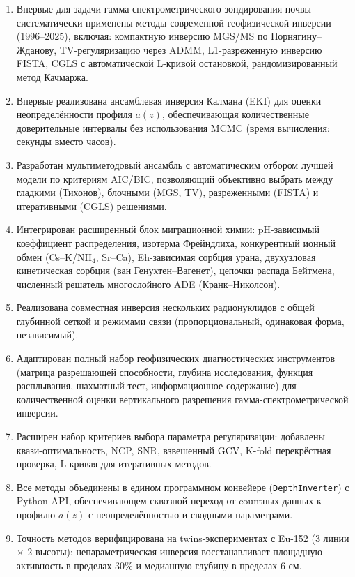 \documentclass[12pt,a4paper]{article}
\begin{document}
\begin{enumerate}[leftmargin=*,itemsep=4pt]
  \item Впервые для задачи гамма-спектрометрического зондирования
        почвы систематически применены методы современной
        геофизической инверсии (1996--2025), включая:
        компактную инверсию MGS/MS по Порнягину--Жданову,
        TV-регуляризацию через ADMM, L1-разреженную инверсию FISTA,
        CGLS с автоматической L-кривой остановкой,
        рандомизированный метод Качмаржа.

  \item Впервые реализована ансамблевая инверсия Калмана (EKI)
        для оценки неопределённости профиля $a(z)$,
        обеспечивающая количественные доверительные интервалы
        без использования MCMC (время вычисления: секунды
        вместо часов).

  \item Разработан мультиметодовый ансамбль с автоматическим
        отбором лучшей модели по критериям AIC/BIC,
        позволяющий объективно выбрать между гладкими (Тихонов),
        блочными (MGS, TV), разреженными (FISTA) и итеративными
        (CGLS) решениями.

  \item Интегрирован расширенный блок миграционной химии:
        pH-зависимый коэффициент распределения,
        изотерма Фрейндлиха, конкурентный ионный обмен
        (Cs--K/NH$_4$, Sr--Ca), Eh-зависимая сорбция урана,
        двухузловая кинетическая сорбция (ван Генухтен--Вагенет),
        цепочки распада Бейтмена, численный решатель
        многослойного ADE (Кранк--Николсон).

  \item Реализована совместная инверсия нескольких радионуклидов
        с общей глубинной сеткой и режимами связи
        (пропорциональный, одинаковая форма, независимый).

  \item Адаптирован полный набор геофизических диагностических
        инструментов (матрица разрешающей способности, глубина
        исследования, функция расплывания, шахматный тест,
        информационное содержание) для количественной оценки
        вертикального разрешения гамма-спектрометрической инверсии.

  \item Расширен набор критериев выбора параметра регуляризации:
        добавлены квази-оптимальность, NCP, SNR, взвешенный GCV,
        K-fold перекрёстная проверка, L-кривая для итеративных методов.

  \item Все методы объединены в едином программном конвейере
        (\texttt{DepthInverter}) с Python API, обеспечивающем
        сквозной переход от countных данных к профилю $a(z)$
        с неопределённостью и сводными параметрами.

  \item Точность методов верифицирована на twins-экспериментах
        с Eu-152 (3 линии $\times$ 2 высоты):
        непараметрическая инверсия восстанавливает площадную
        активность в пределах 30\% и медианную глубину
        в пределах 6 см.
\end{enumerate}
\end{document}

